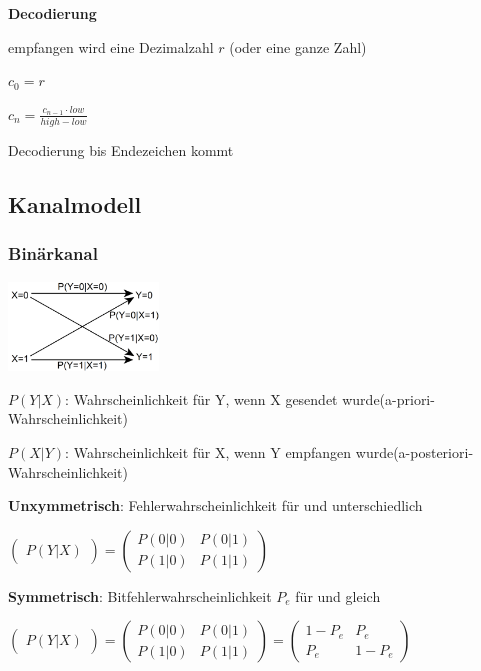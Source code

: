 \textbf{Decodierung}

empfangen wird eine Dezimalzahl $r$ (oder eine ganze Zahl)

$c_0 = r$

$\displaystyle{
    c_n = \frac{c_{n-1} \cdot low}{high - low}
}$

Decodierung bis Endezeichen kommt

\subsection{Kanalmodell}

\subsubsection{Binärkanal}

\includegraphics[width=4cm]{img/kanalmodell.PNG}

$P(Y|X)$: \frqq Wahrscheinlichkeit für Y, wenn X gesendet wurde\flqq (a-priori-Wahrscheinlichkeit)

$P(X|Y)$: \frqq Wahrscheinlichkeit für X, wenn Y empfangen wurde\flqq (a-posteriori-Wahrscheinlichkeit)

\textbf{Unxymmetrisch}: Fehlerwahrscheinlichkeit für \flqq{} und \flqq{} unterschiedlich

$\displaystyle{
    \begin{pmatrix}
        P(Y|X)    
    \end{pmatrix}
    =
    \begin{pmatrix}
        P(0|0) & P(0|1)\\
        P(1|0) & P(1|1)
    \end{pmatrix}
}$

\textbf{Symmetrisch}: Bitfehlerwahrscheinlichkeit $P_e$ für \flqq{} und \flqq{} gleich

$\displaystyle{
    \begin{pmatrix}
        P(Y|X)    
    \end{pmatrix}
    =
    \begin{pmatrix}
        P(0|0) & P(0|1)\\
        P(1|0) & P(1|1)
    \end{pmatrix}
    =
    \begin{pmatrix}
        1-P_e & P_e\\
        P_e & 1-P_e
    \end{pmatrix}
}$


